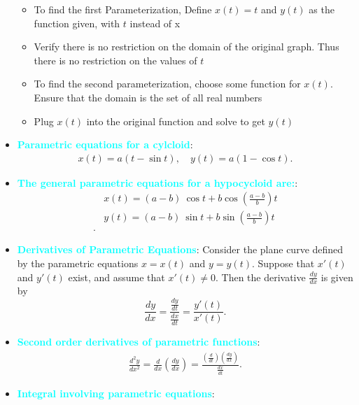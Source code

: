 \documentclass{report}
\begin{document}
\begin{itemize}
\begin{itemize}
                \item To find the first Parameterization, Define $x(t) = t $ and $y(t)$ as the function given, with $t$ instead of x 
                \item Verify there is no restriction on the domain of the original graph. Thus there is no restriction on the values of $t $
            \end{itemize}
            \begin{itemize}
                \item To find the second parameterization, choose some function for $x(t)$. Ensure that the domain is the set of all real numbers
                \item Plug $x(t)$ into the original function and solve to get $y(t)$
            \end{itemize}
        \item \textbf{\textcolor{cyan}{Parametric equations for a cylcloid}}:
            \begin{align*}
                x(t) = a(t-\sin{t}), \quad y(t) = a(1-\cos{t})
            .\end{align*}
        \item \textbf{\textcolor{cyan}{The general parametric equations for a hypocycloid are:}}:
            \begin{align*}
                &x(t) = (a-b)\ \cos{t} + b \cos{\left(\frac{a-b}{b}\right)}t \\
                &y(t) = (a-b)\ \sin{t} + b \sin{\left(\frac{a-b}{b}\right)}t \\
            .\end{align*}
        \item \textbf{\textcolor{cyan}{Derivatives of Parametric Equations}}:
            Consider the plane curve defined by the parametric equations \( x = x(t) \) and \( y = y(t) \). Suppose that \( x'(t) \) and \( y'(t) \) exist, and assume that \( x'(t) \neq 0 \). Then the derivative \( \frac{dy}{dx} \) is given by
            \[
                \frac{dy}{dx} = \frac{\frac{dy}{dt}}{\frac{dx}{dt}} = \frac{y'(t)}{x'(t)}.
            \]
        \item \textbf{\textcolor{cyan}{Second order derivatives of parametric functions}}:
            \begin{align*}
                \frac{d^{2}y}{dx^{2}} = \frac{d}{dx}\left(\frac{dy}{dx}\right) = \frac{\left(\frac{d}{dt}\right)\left(\frac{dy}{dx}\right)}{\frac{dx}{dt}}
            .\end{align*}
        \item \textbf{\textcolor{cyan}{Integral involving parametric equations}}:

\end{itemize}
\end{document}
